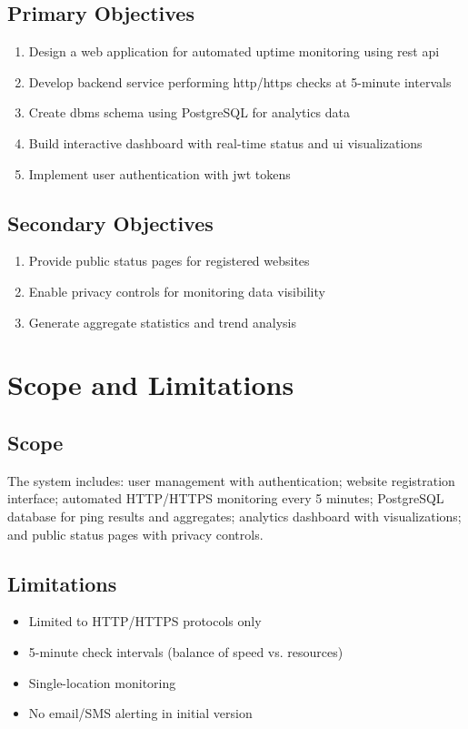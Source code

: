 \subsection{Primary Objectives}
\begin{enumerate}
    \item Design a web application for automated uptime monitoring using \gls{rest} \gls{api}
    \item Develop backend service performing \gls{http}/\gls{https} checks at 5-minute intervals
    \item Create \gls{dbms} schema using PostgreSQL for analytics data
    \item Build interactive dashboard with real-time status and \gls{ui} visualizations
    \item Implement user authentication with \gls{jwt} tokens
\end{enumerate}

\subsection{Secondary Objectives}
\begin{enumerate}
    \item Provide public status pages for registered websites
    \item Enable privacy controls for monitoring data visibility
    \item Generate aggregate statistics and trend analysis
\end{enumerate}

\section{Scope and Limitations}

\subsection{Scope}

The system includes: user management with authentication; website registration interface; automated HTTP/HTTPS monitoring every 5 minutes; PostgreSQL database for ping results and aggregates; analytics dashboard with visualizations; and public status pages with privacy controls.

\subsection{Limitations}

\begin{itemize}
    \item Limited to HTTP/HTTPS protocols only
    \item 5-minute check intervals (balance of speed vs. resources)
    \item Single-location monitoring
    \item No email/SMS alerting in initial version
\end{itemize}

